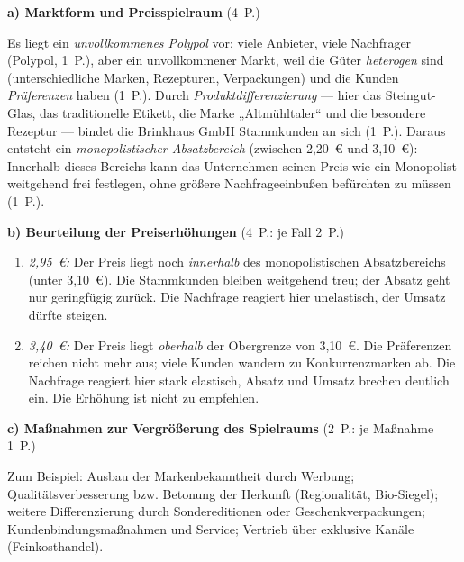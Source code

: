 \begin{loesung}[title={Lösung Aufgabe~1.7 --- Monopolistischer Absatzbereich im unvollkommenen Polypol}]
\textbf{a) Marktform und Preisspielraum} \hfill (4~P.)

Es liegt ein \emph{unvollkommenes Polypol} vor: viele Anbieter, viele Nachfrager
(Polypol, 1~P.), aber ein unvollkommener Markt, weil die Güter \emph{heterogen} sind
(unterschiedliche Marken, Rezepturen, Verpackungen) und die Kunden \emph{Präferenzen}
haben (1~P.). Durch \emph{Produktdifferenzierung} --- hier das Steingut-Glas, das
traditionelle Etikett, die Marke „Altmühltaler`` und die besondere Rezeptur --- bindet
die Brinkhaus GmbH Stammkunden an sich (1~P.). Daraus entsteht ein
\emph{monopolistischer Absatzbereich} (zwischen 2,20~€ und 3,10~€): Innerhalb dieses
Bereichs kann das Unternehmen seinen Preis wie ein Monopolist weitgehend frei festlegen,
ohne größere Nachfrageeinbußen befürchten zu müssen (1~P.).

\textbf{b) Beurteilung der Preiserhöhungen} \hfill (4~P.: je Fall 2~P.)
\begin{enumerate}[label=(\arabic*)]
  \item \emph{2,95~€:} Der Preis liegt noch \emph{innerhalb} des monopolistischen
    Absatzbereichs (unter 3,10~€). Die Stammkunden bleiben weitgehend treu; der Absatz
    geht nur geringfügig zurück. Die Nachfrage reagiert hier unelastisch, der Umsatz
    dürfte steigen.
  \item \emph{3,40~€:} Der Preis liegt \emph{oberhalb} der Obergrenze von 3,10~€. Die
    Präferenzen reichen nicht mehr aus; viele Kunden wandern zu Konkurrenzmarken ab. Die
    Nachfrage reagiert hier stark elastisch, Absatz und Umsatz brechen deutlich ein.
    Die Erhöhung ist nicht zu empfehlen.
\end{enumerate}

\textbf{c) Maßnahmen zur Vergrößerung des Spielraums} \hfill (2~P.: je Maßnahme 1~P.)

Zum Beispiel: Ausbau der Markenbekanntheit durch Werbung; Qualitätsverbesserung bzw.
Betonung der Herkunft (Regionalität, Bio-Siegel); weitere Differenzierung durch
Sondereditionen oder Geschenkverpackungen; Kundenbindungsmaßnahmen und Service;
Vertrieb über exklusive Kanäle (Feinkosthandel).
\end{loesung}

